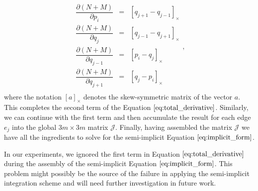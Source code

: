 \documentclass[11pt]{article}
\begin{document}
\begin{appendices}
\begin{equation}
\begin{array}{rcl} 
\dfrac{\partial (N+M)}{\partial p_i} & = & \left[ q_{j+1} - q_{j-1} \right]_{\times} \\ 
\dfrac{\partial (N+M)}{\partial q_j} & = & \left[ q_{j-1} - q_{j+1} \right]_{\times} \\
\dfrac{\partial (N+M)}{\partial q_{j-1}} & = & \left[ p_{i} - q_{j} \right]_{\times} \\
\dfrac{\partial (N+M)}{\partial q_{j+1}} & = & \left[ q_{j} - p_{i} \right]_{\times} \\
\end{array},
\end{equation}
where the notation $\left[ a \right]_{\times} $ denotes the skew-symmetric matrix of the vector $a$. This completes the second term of the Equation $\ref{eq:total_derivative}$. Similarly, we can continue with the first term and then accumulate the result for each edge $e_j$ into the global $3m \times 3m$ matrix $\mathcal{J}$. Finally, having assembled the matrix $\mathcal{J}$ we have all the ingredients to solve for the semi-implicit Equation $\ref{eq:implicit_form}$.

In our experiments, we ignored the first term in Equation $\ref{eq:total_derivative}$ during the assembly of the semi-implicit Equation $\ref{eq:implicit_form}$. This problem might possibly be the source of the failure in applying the semi-implicit integration scheme and will need further investigation in future work.

\end{appendices}
\end{document}
